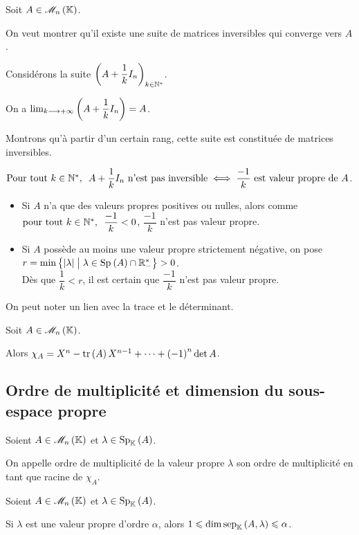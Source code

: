 \begin{dem}
Soit \(A\in\M{n}\).

On veut montrer qu'il existe une suite de matrices inversibles qui converge vers \(A\).

Considérons la suite \(\left(A+\dfrac{1}{k}I_n\right)_{k\in\mathbb{N}^*}\).

On a \(\lim_{k\longrightarrow+\infty}\left(A+\dfrac{1}{k}I_n\right)=A\).

Montrons qu'à partir d'un certain rang, cette suite est constituée de matrices inversibles.

\(\quantifs{\Tpt k\in\Ns}A+\dfrac{1}{k}I_n\text{ n'est pas inversible}\ssi\dfrac{-1}{k}\text{ est valeur propre de }A\).

\begin{itemize}
    \item Si \(A\) n'a que des valeurs propres positives ou nulles, alors comme \(\quantifs{\tpt k\in\Ns}\dfrac{-1}{k}<0\), \(\dfrac{-1}{k}\) n'est pas valeur propre. \\
    \item Si \(A\) possède au moins une valeur propre strictement négative, on pose \(r=\min\accol{\abs{\lambda}\tq\lambda\in\Sp{A}\inter\Rms}>0\). \\ Dès que \(\dfrac{1}{k}<r\), il est certain que \(\dfrac{-1}{k}\) n'est pas valeur propre.
\end{itemize}
\end{dem}

On peut noter un lien avec la trace et le déterminant.

\begin{prop}
Soit \(A\in\M{n}\).

Alors \(\chi_A=X^n-\operatorname{tr}\left(A\right)X^{n-1}+\dots+\left(-1\right)^n\det A\).
\end{prop}

\subsection{Ordre de multiplicité et dimension du sous-espace propre}

\begin{defi}
Soient \(A\in\M{n}\) et \(\lambda\in\Sp[\K]{A}\).

On appelle ordre de multiplicité de la valeur propre \(\lambda\) son ordre de multiplicité en tant que racine de \(\chi_A\).
\end{defi}

\begin{theo}
Soient \(A\in\M{n}\) et \(\lambda\in\Sp[\K]{A}\).

Si \(\lambda\) est une valeur propre d'ordre \(\alpha\), alors \(1\leq\dim\sep[\K]{A}{\lambda}\leq\alpha\).
\end{theo}

